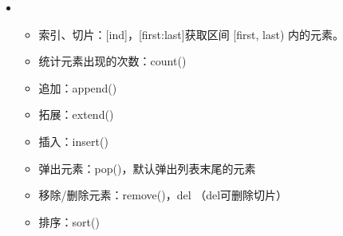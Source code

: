 \documentclass[letterpaper,10pt,english]{sphinxmanual}
\begin{document}
\begin{itemize}
\begin{sphinxVerbatim}[commandchars=\\\{\},numbers=left,firstnumber=1,stepnumber=1]
  
 
\end{sphinxVerbatim}

\begin{sphinxadmonition}{warning}{Warning:}
 是不可变对象，其所有方法都  ，而是返回所创建的新对象。
\end{sphinxadmonition}

\item {} 
\begin{itemize}
\item {} 
索引、切片：{[}ind{]}，{[}first:last{]}获取区间 {[}first, last) 内的元素。

\item {} 
统计元素出现的次数：count()

\item {} 
追加：append()

\item {} 
拓展：extend()

\item {} 
插入：insert()

\item {} 
弹出元素：pop()，默认弹出列表末尾的元素

\item {} 
移除/删除元素：remove()，del （del可删除切片）

\item {} 
排序：sort()

\end{itemize}


\end{itemize}
\end{document}
